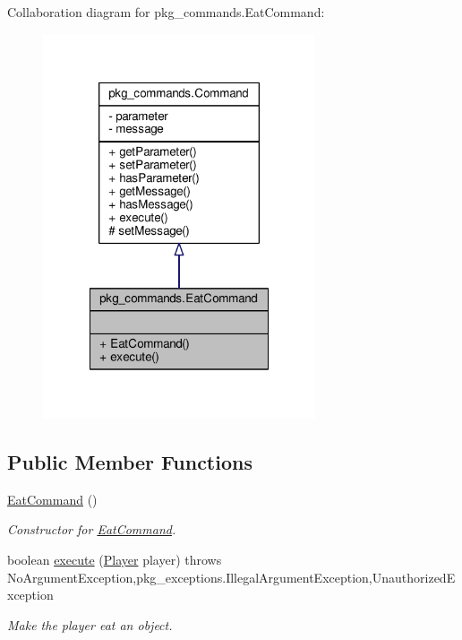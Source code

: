 Collaboration diagram for pkg\-\_\-commands.\-Eat\-Command\-:\nopagebreak
\begin{figure}[H]
\begin{center}
\leavevmode
\includegraphics[width=228pt]{classpkg__commands_1_1EatCommand__coll__graph}
\end{center}
\end{figure}
\subsection*{Public Member Functions}
\begin{DoxyCompactItemize}
\item 
\hyperlink{classpkg__commands_1_1EatCommand_ad83dfae54a7d24140beff2b00201e065}{Eat\-Command} ()
\begin{DoxyCompactList}\small\item\em Constructor for \hyperlink{classpkg__commands_1_1EatCommand}{Eat\-Command}. \end{DoxyCompactList}\item 
boolean \hyperlink{classpkg__commands_1_1EatCommand_a2a600f09891aa076b3f630293de965f4}{execute} (\hyperlink{classpkg__world_1_1Player}{Player} player)  throws No\-Argument\-Exception,pkg\-\_\-exceptions.\-Illegal\-Argument\-Exception,\-Unauthorized\-Exception 
\begin{DoxyCompactList}\small\item\em Make the player eat an object. \end{DoxyCompactList}\end{DoxyCompactItemize}
